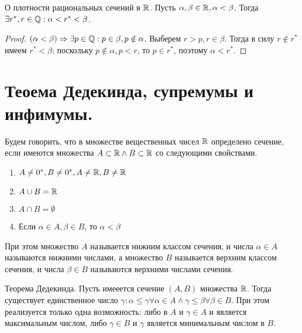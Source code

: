 \documentclass[main]{subfiles}
\begin{document}
\begin{theorem}
    О плотности рациональных сечений в $\mathbb{R}$.
    Пусть $\alpha, \beta \in \mathbb{R}, \alpha < \beta$. Тогда $\exists r^*, r \in \mathbb{Q} :
    \alpha < r^* < \beta$.
\end{theorem}
\begin{proof}
    $(\alpha < \beta) \Rightarrow \exists p \in \mathbb{Q} : p \in \beta, 
    p \notin \alpha$. Выберем $r > p, r \in \beta$. Тогда в силу $r \notin r^*$
    имеем $r^* < \beta$; поскольку $p \notin \alpha, p < r$, то $p \in r^*$, 
    поэтому $\alpha < r^*$.
\end{proof}

\section{Теоема Дедекинда, супремумы и инфимумы.}
\begin{definition}
    Будем говорить, что в множестве вещественных чисел $\mathbb{R}$ определено сечение,
    если имеются множества $A \subset \mathbb{R} \wedge B \subset \mathbb{R}$ со следующими
    свойствами.
    \begin{enumerate}
        \item $A \neq 0^*, B \neq 0^*, A \neq \mathbb{R}, B \neq \mathbb{R}$
        \item $A \cup B = \mathbb{R}$
        \item $A \cap B = \emptyset$
        \item Если $\alpha \in A, \beta \in B$, то $\alpha < \beta$
    \end{enumerate}

    При этом множество $A$ называется нижним классом сечения, и числа 
    $\alpha \in A$ называются нижними числами, а множество $B$ называется 
    верхним классом сечения, и числа $\beta \in B$ называются верхними числами
    сечения.
\end{definition}
\begin{theorem}
    Теорема Дедекинда. Пусть имееется сечение $(A, B)$ множества $\mathbb{R}$. Тогда 
    существует единственное число $\gamma : \alpha \leq \gamma \forall
    \alpha \in A \wedge \gamma \leq \beta \forall \beta \in B$. При этом
    реализуется только одна возможность: либо в $A$ и $\gamma \in A$ и является
    максимальным числом, либо $\gamma \in B$ и $\gamma$ является минимальным
    числом в $B$.   
\end{theorem}
\end{document}
